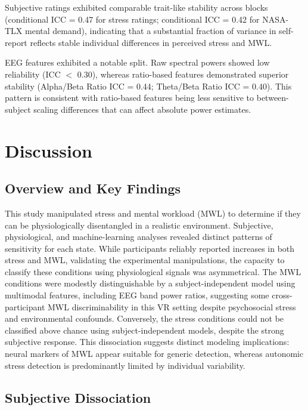 \documentclass[lettersize,journal]{IEEEtran}
\begin{document}
Subjective ratings exhibited comparable trait-like stability across blocks (conditional ICC = 0.47 for stress ratings; conditional ICC = 0.42 for NASA-TLX mental demand), indicating that a substantial fraction of variance in self-report reflects stable individual differences in perceived stress and MWL.

EEG features exhibited a notable split. Raw spectral powers showed low reliability (ICC $<$ 0.30), whereas ratio-based features demonstrated superior stability (Alpha/Beta Ratio ICC = 0.44; Theta/Beta Ratio ICC = 0.40). This pattern is consistent with ratio-based features being less sensitive to between-subject scaling differences that can affect absolute power estimates.


\section{Discussion}

\subsection{Overview and Key Findings}

This study manipulated stress and mental workload (MWL) to determine if they can be physiologically disentangled in a realistic environment. Subjective, physiological, and machine-learning analyses revealed distinct patterns of sensitivity for each state. While participants reliably reported increases in both stress and MWL, validating the experimental manipulations, the capacity to classify these conditions using physiological signals was asymmetrical. The MWL conditions were modestly distinguishable by a subject-independent model using multimodal features, including EEG band power ratios, suggesting some cross-participant MWL discriminability in this VR setting despite psychosocial stress and environmental confounds. Conversely, the stress conditions could not be classified above chance using subject-independent models, despite the strong subjective response. This dissociation suggests distinct modeling implications: neural markers of MWL appear suitable for generic detection, whereas autonomic stress detection is predominantly limited by individual variability.


\subsection{Subjective Dissociation}
\end{document}
